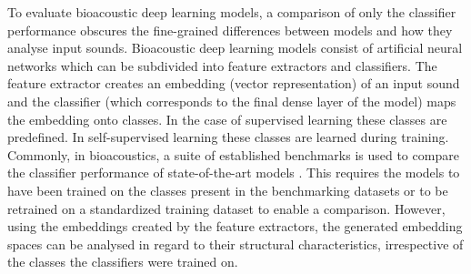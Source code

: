 
To evaluate bioacoustic deep learning models, a comparison of only the classifier performance obscures the fine-grained differences between models and how they analyse input sounds.
Bioacoustic deep learning models consist of artificial neural networks which can be subdivided into feature extractors and classifiers. 
The feature extractor creates an embedding (vector representation) of an input sound and the classifier (which corresponds to the final dense layer of the model) maps the embedding onto classes.
In the case of supervised learning these classes are predefined.
In self-supervised learning these classes are learned during training.
Commonly, in bioacoustics, a suite of established benchmarks is used to compare the classifier performance of state-of-the-art models \cite{hamer_birb_2023,canas_dataset_2023,calonge_revised_2024}.
This requires the models to have been trained on the classes present in the benchmarking datasets or to be retrained on a standardized training dataset to enable a comparison.
However, using the embeddings created by the feature extractors, the generated embedding spaces can be analysed in regard to their structural characteristics, irrespective of the classes the classifiers were trained on.

